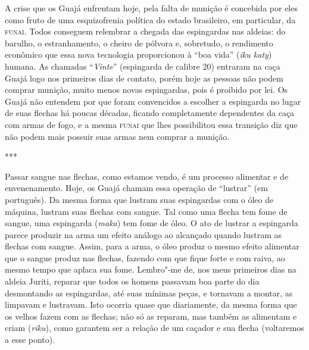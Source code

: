 A crise que os Guajá enfrentam hoje, pela falta de munição é concebida
por eles como fruto de uma esquizofrenia política do estado brasileiro,
em particular, da \textsc{funai}. Todos conseguem relembrar a chegada das
espingardas nas aldeias: do barulho, o estranhamento, o cheiro de
pólvora e, sobretudo, o rendimento econômico que essa nova tecnologia
proporcionou à ``boa vida'' (\emph{iku katy}) humana. As chamadas
``\emph{Vinte}'' (espingarda de calibre 20) entraram na caça Guajá logo
nos primeiros dias de contato, porém hoje as pessoas não podem comprar
munição, muito menos novas espingardas, pois é proibido por lei. Os
Guajá não entendem por que foram convencidos a escolher a espingarda no
lugar de suas flechas há poucas décadas, ficando completamente
dependentes da caça com armas de fogo, e a mesma \textsc{funai} que lhes
possibilitou essa transição diz que não podem mais possuir suas armas
nem comprar a munição.

\begin{center}
***
\end{center}

Passar sangue nas flechas, como estamos vendo, é um processo alimentar e
de envenenamento. Hoje, os Guajá chamam essa operação de ``lustrar'' (em
português). Da mesma forma que lustram suas espingardas com o óleo de
máquina, lustram suas flechas com sangue. Tal como uma flecha tem fome
de sangue, uma espingarda (\emph{maka}) tem fome de óleo. O ato de
lustrar a espingarda parece produzir na arma um efeito análogo ao
alcançado quando lustram as flechas com sangue. Assim, para a arma, o
óleo produz o mesmo efeito alimentar que o sangue produz nas flechas,
fazendo com que fique forte e com raiva, ao mesmo tempo que aplaca sua
fome. Lembro"-me de, nos meus primeiros dias na aldeia Juriti, reparar
que todos os homens passavam boa parte do dia desmontando as
espingardas, até suas mínimas peças, e tornavam a montar, as limpavam e
lustravam. Isto ocorria quase que diariamente, da mesma forma que os
velhos fazem com as flechas; não só as reparam, mas também as alimentam
e criam (\emph{riku}), como garantem ser a relação de um caçador e sua
flecha (voltaremos a esse ponto).

